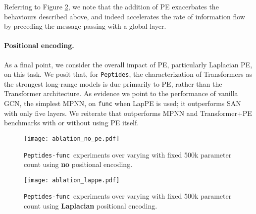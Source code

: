 \documentclass{article}
\newcommand{\func}{\texttt{Peptides-func}}
\theoremstyle{plain}
\theoremstyle{definition}
\theoremstyle{remark}
\begin{document}
Referring to Figure \ref{Fig:func_lappe_ablation}, we note that the addition of PE exacerbates the behaviours described above, and indeed accelerates the rate of information flow by preceding the message-passing with a global layer.

\paragraph{Positional encoding.}
As a final point, we consider the overall impact of PE, particularly Laplacian PE, on this task. We posit that, for \texttt{Peptides}, the characterization of Transformers as the strongest long-range models \cite{dwivedi2022long} is due primarily to PE, rather than the Transformer architecture. As evidence we point to the performance of vanilla GCN, the simplest MPNN, on \texttt{func} when LapPE is used; it outperforms SAN with only five layers.
We reiterate that  outperforms MPNN and Transformer+PE benchmarks with or without using PE itself.


 \begin{figure}[ht]
\begin{center}
\centerline{\texttt{[image: ablation\_no\_pe.pdf]}}
\caption{\func\ experiments over varying  with fixed 500k parameter count using \textbf{no} positional encoding.}
\label{Fig:func_ablation}
\end{center}
\end{figure}

 \begin{figure}[ht]
\begin{center}
\centerline{\texttt{[image: ablation\_lappe.pdf]}}
\caption{\func\ experiments over varying  with fixed 500k parameter count using \textbf{Laplacian} positional encoding.}
\label{Fig:func_lappe_ablation}
\end{center}
\end{figure}
\end{document}
